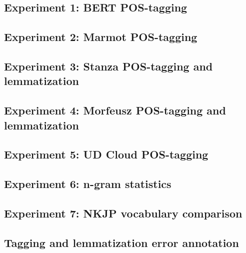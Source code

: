 \subsection{Experiment 1: BERT POS-tagging}
\label{subsec:bert-tagging}

\subsection{Experiment 2: Marmot POS-tagging}
\label{subsec:marmot-tagging}

\subsection{Experiment 3: Stanza POS-tagging and lemmatization}
\label{subsec:stanza-tagging}

\subsection{Experiment 4: Morfeusz POS-tagging and lemmatization}
\label{subsec:morfeusz-tagging}

\subsection{Experiment 5: UD Cloud POS-tagging}
\label{subsec:ud-tagging}

\subsection{Experiment 6: n-gram statistics}
\label{subsec:ngrams}

\subsection{Experiment 7: NKJP vocabulary comparison}
\label{subsec:nkjp-vocab}

\subsection{Tagging and lemmatization error annotation}
\label{subsec:error-annotation}